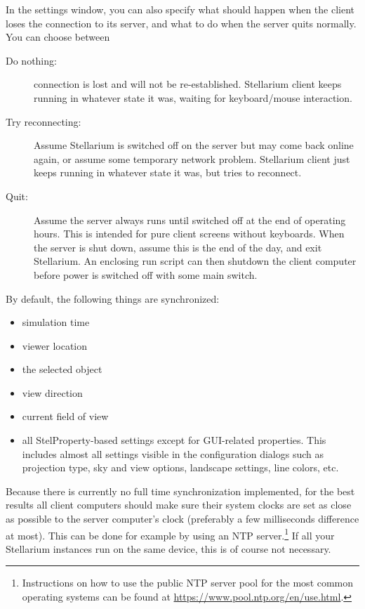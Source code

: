 In the settings window, you can also specify what should happen when the client 
loses the connection to its server, and what to do when the server quits 
normally. You can choose between 
\begin{description}
\item[Do nothing:] connection is lost and will not be re-established. Stellarium client keeps running 
     in whatever state it was, waiting for keyboard/mouse interaction. 
\item[Try reconnecting:] Assume Stellarium is switched off on the server
      but may come back online again, or assume some temporary network problem. 
	  Stellarium client just keeps running in whatever state it was, but tries to reconnect.
\item[Quit:] Assume the server always runs until switched off at the end of operating hours. 
      This is intended for pure client screens without keyboards. When the server  
	  is shut down, assume this is the end of the day, and exit Stellarium. An enclosing run script 
	  can then shutdown the client computer before power is switched off with some main switch. 
\end{description}
By default, the following things are synchronized:
\begin{itemize}
	\item simulation time
	\item viewer location
	\item the selected object
	\item view direction
	\item current field of view
	\item all StelProperty-based settings except for GUI-related properties. 
	This includes almost all settings visible in the configuration dialogs such 
	as projection type, sky and view options, landscape settings, line colors, etc.
\end{itemize}

\noindent Because there is currently no full time synchronization implemented, for the best
results all client computers should make sure their system clocks are set as
close as possible to the server computer's clock (preferably a few milliseconds
difference at most). This can be done for example by using an NTP server.\footnote{
Instructions on how to use the public NTP server pool for the most common
operating systems can be found at \url{https://www.pool.ntp.org/en/use.html}.} 
If all your Stellarium instances run on the same device, this is of course not 
necessary.

